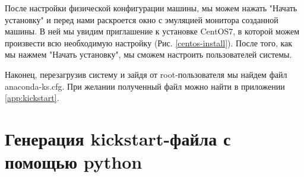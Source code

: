 
После настройки физической конфигурации машины, мы можем нажать
"Начать установку" и перед нами раскроется окно с эмуляцией
монитора созданной машины. В ней мы увидим приглашение к установке
CentOS7, в которой можем произвести всю необходимую настройку
(Рис. \ref{centos-install}). После того, как мы
нажмем "Начать установку", мы сможем настроить пользователей
системы.

Наконец, перезагрузив систему и зайдя от \textmd{root}-пользователя
мы найдем файл \textmd{anaconda-ks.cfg}. При желании полученный
файл можно найти в приложении \ref{app:kickstart}.

\clearpage
\section{Генерация kickstart-файла с помощью python}


